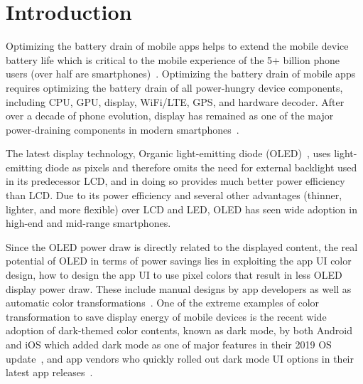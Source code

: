 \vspace{-0.01in}

\section{Introduction}
\label{sec:intro}

Optimizing the battery drain of mobile apps helps to extend the
mobile device battery life which is critical to the mobile experience
of the 5+ billion phone users (over half are smartphones)~\cite{gsma2019}.
Optimizing the battery drain of mobile
apps requires optimizing the battery drain of all power-hungry
device components, including CPU, GPU, display, WiFi/LTE,
GPS, and hardware decoder. After over a decade of phone evolution, display
has remained as one of the major power-draining components in modern
smartphones~\cite{dong2009current,dong:2011chameleon,chen:2013:display,wan:2017:displayenergy,chen:2016:dac,chan:2016:image,crayon:eurosys16}.

The latest display technology, Organic light-emitting diode (OLED)~\cite{oled:2003,oled:2004},
uses light-emitting diode as pixels and therefore omits the need for
external backlight used in its predecessor LCD, and in doing so
provides much better power efficiency than LCD.  Due to its power
efficiency and several other advantages (thinner, lighter, and more
flexible) over LCD and LED, OLED has seen wide adoption in high-end and mid-range
smartphones.

Since the OLED power draw is directly related to the displayed
content, the real potential of OLED in terms of power savings lies in
exploiting the app UI color design, \ie how to design the app UI 
to use pixel colors that result in less OLED display power draw.
These include manual designs by app developers as well as
automatic color transformations~\cite{dong:ispled09,dong:2011chameleon,crayon:eurosys16}.
One of the extreme examples of color transformation to save display energy of mobile
devices is the recent wide adoption of 
dark-themed color contents, known as dark mode,
by both Android and iOS which added dark mode as one of major
features in their 2019 OS
update~\cite{googledevsummit2018,appleaccouncedarkmode}, and app
vendors who quickly rolled out dark mode UI options in their latest
app releases~\cite{darkModeActicle1,darkModeActicle2,darkModeActicle3,darkModeActicle4,darkModeActicle5,darkModeActicle6,darkModeActicle7}.

